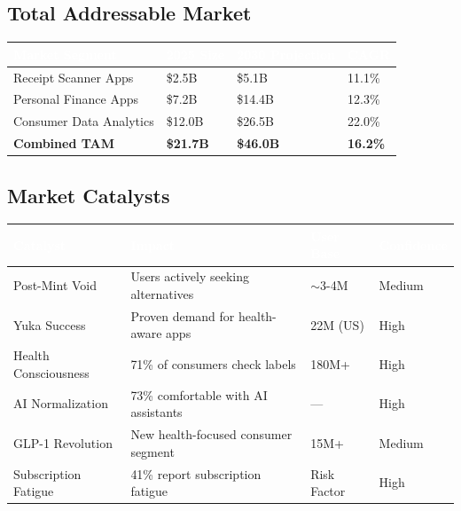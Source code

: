 \documentclass[11pt,a4paper]{article}
\begin{document}
\subsection{Total Addressable Market}

\begin{center}
\begin{tabular}{L{4.5cm} R{2.5cm} R{3cm} R{2cm}}
    \toprule
    \textcolor{white}{\textbf{Market Segment}} & \textcolor{white}{\textbf{2025 Size}} & \textcolor{white}{\textbf{2030 Projection}} & \textcolor{white}{\textbf{CAGR}}\\
    \midrule
    Receipt Scanner Apps & \$2.5B & \$5.1B & 11.1\%\\
    Personal Finance Apps & \$7.2B & \$14.4B & 12.3\%\\
    Consumer Data Analytics & \$12.0B & \$26.5B & 22.0\%\\
    \textbf{Combined TAM} & \textbf{\$21.7B} & \textbf{\$46.0B} & \textbf{16.2\%}\\
    \bottomrule
\end{tabular}
\end{center}

\subsection{Market Catalysts}

\begin{center}
\begin{tabular}{L{3.5cm} L{5cm} R{2.5cm} C{2cm}}
    \toprule
    \textcolor{white}{\textbf{Catalyst}} & \textcolor{white}{\textbf{Impact}} & \textcolor{white}{\textbf{User Base}} & \textcolor{white}{\textbf{Confidence}}\\
    \midrule
    Post-Mint Void & Users actively seeking alternatives & $\sim$3-4M & Medium\\
    Yuka Success & Proven demand for health-aware apps & 22M (US) & High\\
    Health Consciousness & 71\% of consumers check labels & 180M+ & High\\
    AI Normalization & 73\% comfortable with AI assistants & --- & High\\
    GLP-1 Revolution & New health-focused consumer segment & 15M+ & Medium\\
    Subscription Fatigue & 41\% report subscription fatigue & Risk Factor & High\\
    \bottomrule
\end{tabular}
\end{center}
\end{document}
